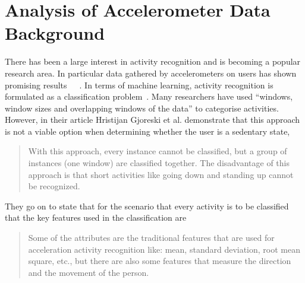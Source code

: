 \section{Analysis of Accelerometer Data Background}
\label{sec:accanalback}

There has been a large interest in activity recognition and is becoming a popular research area. In particular data gathered by accelerometers on users has shown promising results~\cite{bao2004annotated}~\cite{ravi2005recognition}~\cite{randell2000awerness}. In terms of machine learning, activity recognition is formulated as a classification problem~\cite{ravi2005recognition}. Many researchers have used ``windows, window sizes and overlapping windows of the data''\cite{ravi2005recognition} to categorise activities. However, in their article Hristijan Gjoreski et al. demonstrate that this approach is not a viable option when determining whether the user is a sedentary state, 
\begin{quote}
With this approach, every instance cannot be classified, but a group of instances (one window) are classified together. The disadvantage of this approach is that short activities like going down and standing up cannot be recognized.
\end{quote}
They go on to state that for the scenario that every activity is to be classified that the key features used in the classification are
\begin{quote}
Some of the attributes are the traditional features that are used for acceleration activity recognition like: mean, standard deviation, root mean square, etc., but there are also some features that measure the direction and the movement of the person.
\end{quote}
